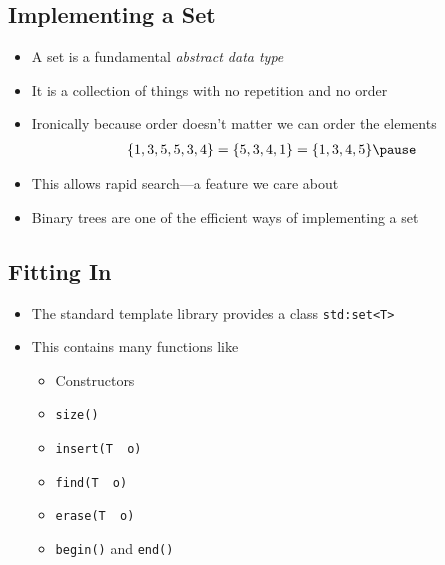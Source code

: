 
\begin{slide}
\section{Implementing a Set}

\begin{PauseHighLight}
  \begin{itemize}
  \item A set is a fundamental \emph{abstract data type}\pause
  \item It is a collection of things with no repetition and no
    order\pause
  \item Ironically because order doesn't matter we can order the
    elements
    \begin{align*}
      \{1,3,5,5,3,4\} = \{5, 3, 4, 1\} = \{1, 3, 4, 5\}\pause 
    \end{align*}
  \item This allows rapid search---a feature we care about\pause
  \item Binary trees are one of the efficient ways of implementing a set\pause
  \end{itemize}
\end{PauseHighLight}
\end{slide}



\begin{slide}
  \section[-1]{Fitting In}

  \begin{PauseHighLight}
    \begin{itemize}
    \item The standard template library provides a class \texttt{std:set<T>}\pause
    \item This contains many functions like
      \begin{itemize}
      \item Constructors
      \item \texttt{size()}
      \item \texttt{insert(T\, o)}
      \item \texttt{find(T\, o)}
      \item \texttt{erase(T\, o)}
      \item \texttt{begin()} and \texttt{end()}
      \end{itemize}\pause
    \end{itemize}
  \end{PauseHighLight}
\end{slide}

